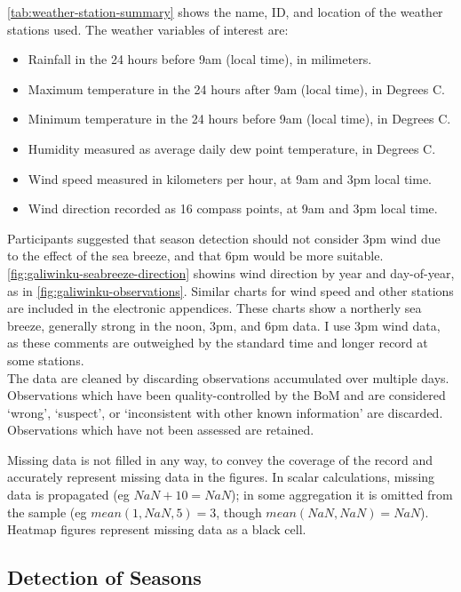 \autoref{tab:weather-station-summary} shows the name, ID, and location of
the weather stations used.
%
The weather variables of interest are:
\begin{itemize}
\item Rainfall in the 24 hours before 9am (local time), in milimeters.
\item Maximum temperature in the 24 hours after 9am (local time), in Degrees C.
\item Minimum temperature in the 24 hours before 9am (local time), in Degrees C.
\item Humidity measured as average daily dew point temperature, in Degrees C.
\item Wind speed measured in kilometers per hour, at 9am and 3pm local time.
\item Wind direction recorded as 16 compass points, at 9am and 3pm local time.
\end{itemize}

Participants suggested that season detection should not consider 3pm wind
due to the effect of the sea breeze, and that 6pm would be more suitable.
\autoref{fig:galiwinku-seabreeze-direction} showins wind direction by year
and day-of-year, as in \autoref{fig:galiwinku-observations}.
%
Similar charts for wind speed and other stations are included in the electronic
appendices.  These charts show a northerly sea breeze, generally strong in the
noon, 3pm, and 6pm data.  I use 3pm wind data, as these comments are outweighed
by the standard time and longer record at some stations.\\

The data are cleaned by discarding observations accumulated over multiple days.
Observations which have been quality-controlled by the BoM and are considered
`wrong', `suspect', or `inconsistent with other known information' are discarded.
Observations which have not been assessed are retained.

Missing data is not filled in any way, to convey the coverage of the record
and accurately represent missing data in the figures.  In scalar calculations,
missing data is propagated (eg ${NaN+10=NaN}$); in some aggregation
it is omitted from the sample (eg ${mean(1,NaN,5)=3}$, though
${mean(NaN,NaN)=NaN}$). Heatmap figures represent missing data as a black cell.


\subsection{Detection of Seasons}

